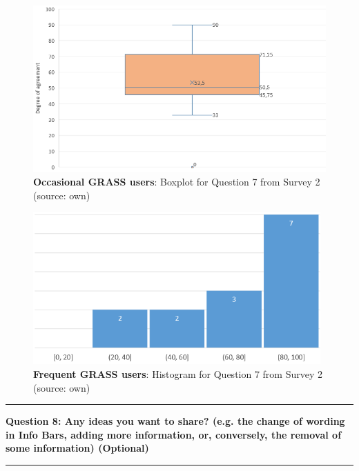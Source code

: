 \documentclass[a4paper,10pt,twoside]{article}
\begin{document}
\newpage
\begin{figure}[hbt!] 
\begin{center}
\includegraphics[width=12cm]{../surveys/analyzed_data/survey2_question7_boxplot_group1.png} 
\caption[\textbf{Occasional GRASS users}: Boxplot for Question 7 from Survey 2]{\textbf{Occasional GRASS users}: Boxplot for Question 7 from Survey 2 (source: own)}
\label{fig:survey2_question7_boxplot_group1}
\end{center}
\end{figure}

\vspace{0.3cm}
\begin{figure}[hbt!] 
\begin{center}
\includegraphics[width=11cm]{../surveys/analyzed_data/survey2_question7_histogram_group2.png} 
\caption[\textbf{Frequent GRASS users}: Histogram for Question 7 from Survey 2]{\textbf{Frequent GRASS users}: Histogram for Question 7 from Survey 2 (source: own)}
\label{fig:survey2_question7_histogram_group2}
\end{center}
\end{figure}

\par\noindent\rule{\textwidth}{0.4pt}
\noindent \textbf{Question 8: Any ideas you want to share? (e.g. the change of wording in Info Bars, adding more information, or, conversely, the removal of some information) (Optional)}
\par\noindent\rule{\textwidth}{0.4pt}
\end{document}
